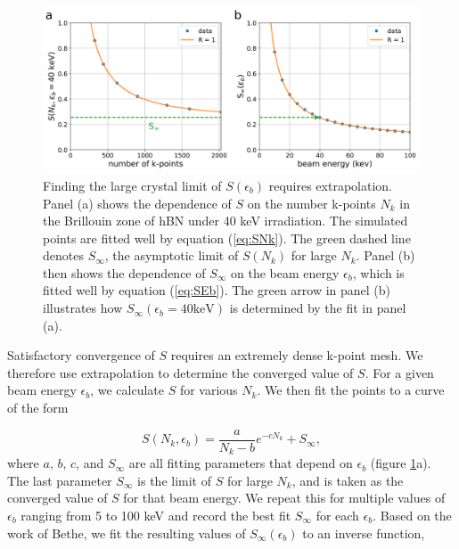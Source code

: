 \documentclass{article}
\begin{document}
\begin{figure}[H]
  \centering
  \includegraphics[width=\textwidth]{figures/sum.pdf}
  \caption{
    Finding the large crystal limit of $S(\epsilon_b)$ requires extrapolation.
    Panel (a) shows the dependence of $S$ on the number k-points $N_k$ in the
    Brillouin zone of hBN under 40 keV irradiation.
    The simulated points are fitted well by equation (\ref{eq:SNk}).
    The green dashed line denotes $S_\infty$, the asymptotic limit of $S(N_k)$
    for large $N_k$.
    Panel (b) then shows the dependence of $S_\infty$ on the beam energy
    $\epsilon_b$, which is fitted well by equation (\ref{eq:SEb}).
    The green arrow in panel (b) illustrates how $S_\infty(\epsilon_b=40\text{
    keV})$ is determined by the fit in panel (a).
  }
  \label{fig:Sfit}
\end{figure}

Satisfactory convergence of $S$ requires an extremely dense k-point mesh.
We therefore use extrapolation to determine the converged value of $S$.
For a given beam energy $\epsilon_b$, we calculate $S$ for various $N_k$.
We then fit the points to a curve of the form

\begin{equation}
  S(N_k, \epsilon_b)
  =
  \frac{a}{N_k-b}e^{-cN_k} + S_\infty,
  \label{eq:SNk}
\end{equation}
%
where $a$, $b$, $c$, and $S_\infty$ are all fitting parameters that depend on
$\epsilon_b$ (figure \ref{fig:Sfit}a).
The last parameter $S_\infty$ is the limit of $S$ for large $N_k$, and is taken
as the converged value of $S$ for that beam energy.
We repeat this for multiple values of $\epsilon_b$ ranging from 5 to 100 keV
and record the best fit
$S_\infty$ for each
$\epsilon_b$.
Based on the work of Bethe,\cite{Bethe1930, Susi2019, Kretschmer2020} we fit the resulting values of
$S_\infty(\epsilon_b)$ to an inverse function,
\end{document}
